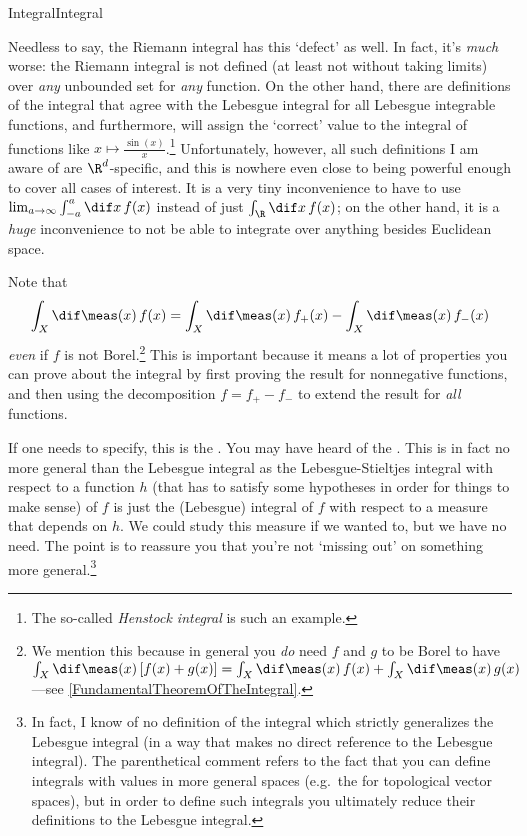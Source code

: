 \begin{dfn}{Integral}{Integral}
\begin{rmk}
Needless to say, the Riemann integral has this `defect' as well.  In fact, it's \emph{much} worse:  the Riemann integral is not defined (at least not without taking limits) over \emph{any} unbounded set for \emph{any} function.  On the other hand, there are definitions of the integral that agree with the Lebesgue integral for all Lebesgue integrable functions, and furthermore, will assign the `correct' value to the integral of functions like $x\mapsto \frac{\sin (x)}{x}$.\footnote{The so-called \emph{Henstock integral} is such an example.}  Unfortunately, however, all such definitions I am aware of are $\R ^d$-specific, and this is nowhere even close to being powerful enough to cover all cases of interest.  It is a very tiny inconvenience to have to use $\lim _{a\to \infty}\int _{-a}^a\dif x\, f(x)$ instead of just $\int _{\R}\dif x\, f(x)$; on the other hand, it is a \emph{huge} inconvenience to not be able to integrate over anything besides Euclidean space.
\end{rmk}
\begin{rmk}
Note that
\begin{equation*}
\int _X\dif \meas (x)\, f(x)=\int _X\dif \meas (x)\, f_+(x)-\int _X\dif \meas (x)\, f_-(x)
\end{equation*}
\emph{even} if $f$ is not Borel.\footnote{We mention this because in general you \emph{do} need $f$ and $g$ to be Borel to have $\int _X\dif \meas (x)\, [f(x)+g(x)]=\int _X\dif \meas (x)\, f(x)+\int _X\dif \meas (x)\, g(x)$---see \cref{FundamentalTheoremOfTheIntegral}.}  This is important because it means a lot of properties you can prove about the integral by first proving the result for nonnegative functions, and then using the decomposition $f=f_+-f_-$ to extend the result for \emph{all} functions.
\end{rmk}
\begin{rmk}
If one needs to specify, this is the .  You may have heard of the .  This is in fact no more general than the Lebesgue integral as the Lebesgue-Stieltjes integral with respect to a function $h$ (that has to satisfy some hypotheses in order for things to make sense) of $f$ is just the (Lebesgue) integral of $f$ with respect to a measure that depends on $h$.  We could study this measure if we wanted to, but we have no need.  The point is to reassure you that you're not `missing out' on something more general.\footnote{In fact, I know of no definition of the integral which strictly generalizes the Lebesgue integral (in a way that makes no direct reference to the Lebesgue integral).  The parenthetical comment refers to the fact that you can define integrals with values in more general spaces (e.g.~the  for topological vector spaces), but in order to define such integrals you ultimately reduce their definitions to the Lebesgue integral.}
\end{rmk}
\end{dfn}
